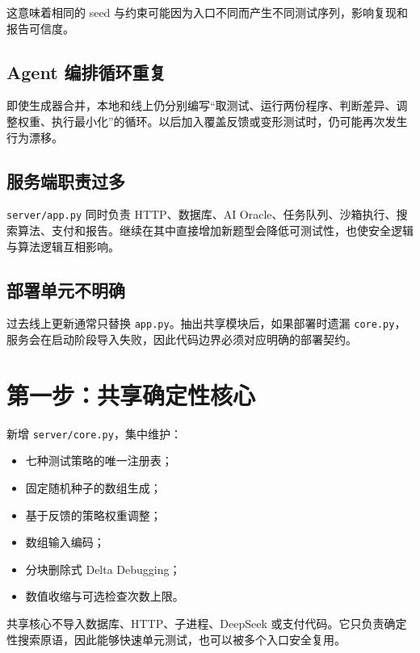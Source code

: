 \documentclass[10pt,a4paper]{ctexart}
\newcommand{\code}[1]{\texttt{#1}}
\begin{document}
这意味着相同的 seed 与约束可能因为入口不同而产生不同测试序列，影响复现和报告可信度。

\subsection{Agent 编排循环重复}

即使生成器合并，本地和线上仍分别编写“取测试、运行两份程序、判断差异、调整权重、执行最小化”的循环。以后加入覆盖反馈或变形测试时，仍可能再次发生行为漂移。

\subsection{服务端职责过多}

\code{server/app.py} 同时负责 HTTP、数据库、AI Oracle、任务队列、沙箱执行、搜索算法、支付和报告。继续在其中直接增加新题型会降低可测试性，也使安全逻辑与算法逻辑互相影响。

\subsection{部署单元不明确}

过去线上更新通常只替换 \code{app.py}。抽出共享模块后，如果部署时遗漏 \code{core.py}，服务会在启动阶段导入失败，因此代码边界必须对应明确的部署契约。

\section{第一步：共享确定性核心}

新增 \code{server/core.py}，集中维护：

\begin{itemize}
  \item 七种测试策略的唯一注册表；
  \item 固定随机种子的数组生成；
  \item 基于反馈的策略权重调整；
  \item 数组输入编码；
  \item 分块删除式 Delta Debugging；
  \item 数值收缩与可选检查次数上限。
\end{itemize}

共享核心不导入数据库、HTTP、子进程、DeepSeek 或支付代码。它只负责确定性搜索原语，因此能够快速单元测试，也可以被多个入口安全复用。
\end{document}
